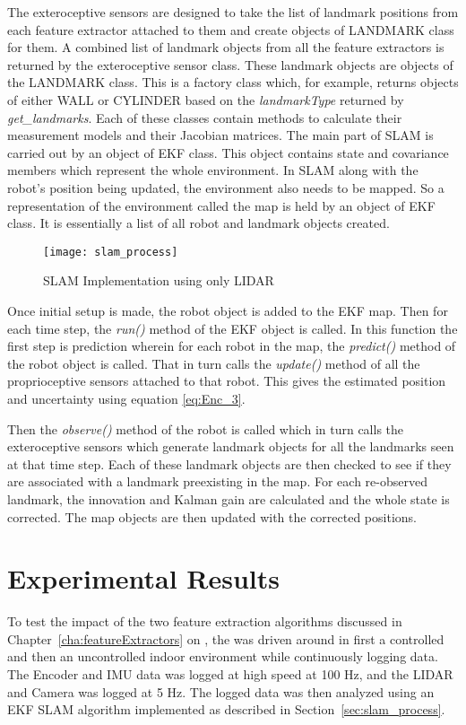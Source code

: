 The exteroceptive sensors are designed to take the list of landmark positions from each feature extractor attached to them and create objects of LANDMARK class for them. A combined list of landmark objects from all the feature extractors is returned by the exteroceptive sensor class. These landmark objects are objects of the LANDMARK class. This is a factory class which, for example, returns objects of either WALL or CYLINDER based on the \textit{landmarkType} returned by \textit{get\_landmarks}. Each of these classes contain methods to calculate their measurement models and their Jacobian matrices.
The main part of SLAM is carried out by an object of EKF class. This object contains  state and covariance members which represent the whole environment. In SLAM along with the robot's position being updated, the environment also needs to be mapped. So a representation of the environment called the map is held by an object of EKF class. It is essentially a list of all robot and landmark objects created.

\begin{figure}
\centering
\texttt{[image: slam\_process]}
\caption{SLAM Implementation using only LIDAR}
\label{fig:slam_process}
\end{figure}
Once initial setup is made, the robot object is added to the EKF map. Then for each time step, the \textit{run()} method of the EKF object is called. In this function the first step is prediction wherein for each robot in the map, the \textit{predict()} method of the robot object is called. That in turn calls the \textit{update()} method of all the proprioceptive sensors attached to that robot. This gives the estimated position and uncertainty using equation \ref{eq:Enc_3}. 

Then the \textit{observe()} method of the robot is called which in turn calls the exteroceptive sensors which generate landmark objects for all the landmarks seen at that time step. Each of these landmark objects are then checked to see if they are associated with a landmark preexisting in the map. For each re-observed landmark, the innovation and Kalman gain are calculated and the whole state is corrected. The map objects are then updated with the corrected positions. 

\section{Experimental Results}

To test the impact of the two feature extraction algorithms discussed in Chapter~\ref{cha:featureExtractors} on \slam, the \imp was driven around in first a controlled and then an uncontrolled indoor environment while continuously logging data. The Encoder and IMU data was logged at high speed at 100 Hz, and the LIDAR and Camera was logged at 5 Hz. The logged data was then analyzed using an EKF SLAM algorithm implemented as described in Section~\ref{sec:slam_process}. 


